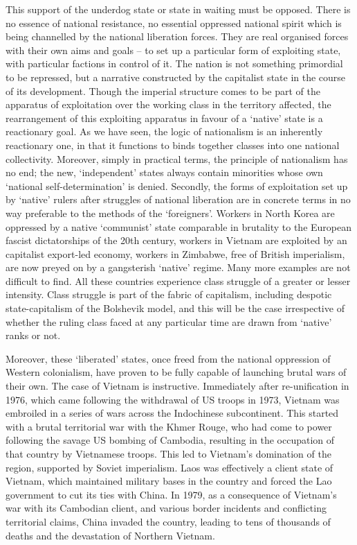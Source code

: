 This support of the underdog state or state in waiting must be opposed.
There is no essence of national resistance, no essential oppressed national spirit which is being channelled by the national liberation forces.
They are real organised forces with their own aims and goals – to set up a particular form of exploiting state, with particular factions in control of it.
The nation is not something primordial to be repressed, but a narrative constructed by the capitalist state in the course of its development.
Though the imperial structure comes to be part of the apparatus of exploitation over the working class in the territory affected, the rearrangement of this exploiting apparatus in favour of a ‘native’ state is a reactionary goal.
As we have seen, the logic of nationalism is an inherently reactionary one, in that it functions to binds together classes into one national collectivity.
Moreover, simply in practical terms, the principle of nationalism has no end; the new, ‘independent’ states always contain minorities whose own ‘national self-determination’ is denied.
Secondly, the forms of exploitation set up by ‘native’ rulers after struggles of national liberation are in concrete terms in no way preferable to the methods of the ‘foreigners’.
Workers in North Korea are oppressed by a native ‘communist’ state comparable in brutality to the European fascist dictatorships of the 20th century, workers in Vietnam are exploited by an capitalist export-led economy, workers in Zimbabwe, free of British imperialism, are now preyed on by a gangsterish ‘native’ regime.
Many more examples are not difficult to find.
All these countries experience class struggle of a greater or lesser intensity.
Class struggle is part of the fabric of capitalism, including despotic state-capitalism of the Bolshevik model, and this will be the case irrespective of whether the ruling class faced at any particular time are drawn from ‘native’ ranks or not.

Moreover, these ‘liberated’ states, once freed from the national oppression of Western colonialism, have proven to be fully capable of launching brutal wars of their own.
The case of Vietnam is instructive.
Immediately after re-unification in 1976, which came following the withdrawal of US troops in 1973, Vietnam was embroiled in a series of wars across the Indochinese subcontinent.
This started with a brutal territorial war with the Khmer Rouge, who had come to power following the savage US bombing of Cambodia, resulting in the occupation of that country by Vietnamese troops.
This led to Vietnam’s domination of the region, supported by Soviet imperialism.
Laos was effectively a client state of Vietnam, which maintained military bases in the country and forced the Lao government to cut its ties with China.
In 1979, as a consequence of Vietnam’s war with its Cambodian client, and various border incidents and conflicting territorial claims, China invaded the country, leading to tens of thousands of deaths and the devastation of Northern Vietnam.

